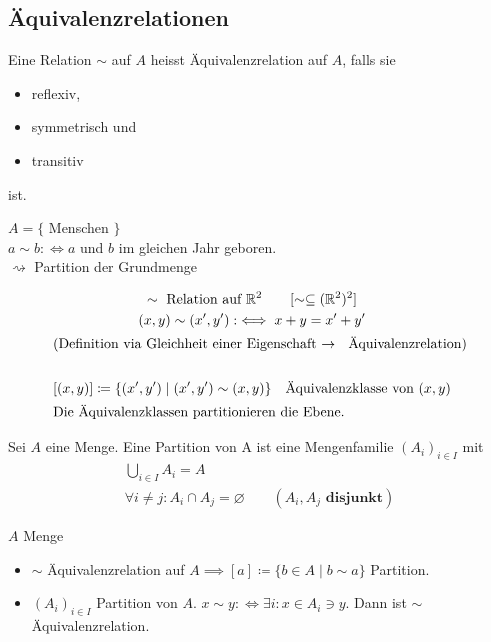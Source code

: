 \subsection{Äquivalenzrelationen}
\begin{def*}[note = Äquivalenzrelation , index = Äquivalenzrelation]
	Eine Relation $\sim$ auf $A$ heisst Äquivalenzrelation auf $A$, falls sie
	\begin{itemize}
		\item reflexiv,
		\item symmetrisch und
		\item transitiv
	\end{itemize}
	ist.
\end{def*}
\begin{bsp*}
	$A = \{$ Menschen $\}$ \\
	$a \sim b : \iff a $ und $b$ im gleichen Jahr geboren. \\
	$\rightsquigarrow$ Partition der Grundmenge
\end{bsp*}
\begin{bsp*}
	\begin{gather*}
		\sim \text{ Relation auf } \mathbb{R}^2 \qquad [ \sim \subseteq (\mathbb{R}^2)^2 ] \\
		(x,y) \sim (x',y') :\iff x + y = x' + y' \\
		\intertext{(Definition via Gleichheit einer Eigenschaft $\rightarrow$ Äquivalenzrelation)}\\
		[(x,y)] \coloneqq \{ (x',y') \mid (x',y') \sim (x,y) \} \quad \text{Äquivalenzklasse von } (x,y) \\
		\intertext{Die Äquivalenzklassen partitionieren die Ebene.}
	\end{gather*}
\end{bsp*}
\begin{def*}[note = Partition , index = Partition]
	Sei $A$ eine Menge. Eine Partition von A ist eine Mengenfamilie $(A_i)_{i \in I}$ mit\\
	\begin{gather*}
		\bigcup_{i \in I} A_i = A \\
		\forall i \neq j : A_i \cap A_j = \varnothing \qquad (A_i , A_j \textbf{ disjunkt} )
	\end{gather*}
\end{def*}
\begin{satz*}
	$A$ Menge\\
	\begin{itemize}
		\item $\sim$ Äquivalenzrelation auf $A \implies [a] \coloneqq \{ b \in A \mid b \sim a \}$ Partition.
		\item $(A_i)_{i \in I}$ Partition von $A$. $x \sim y :\iff \exists i : x \in A_i \ni y$. Dann ist $\sim$ Äquivalenzrelation.
	\end{itemize}
\end{satz*}
